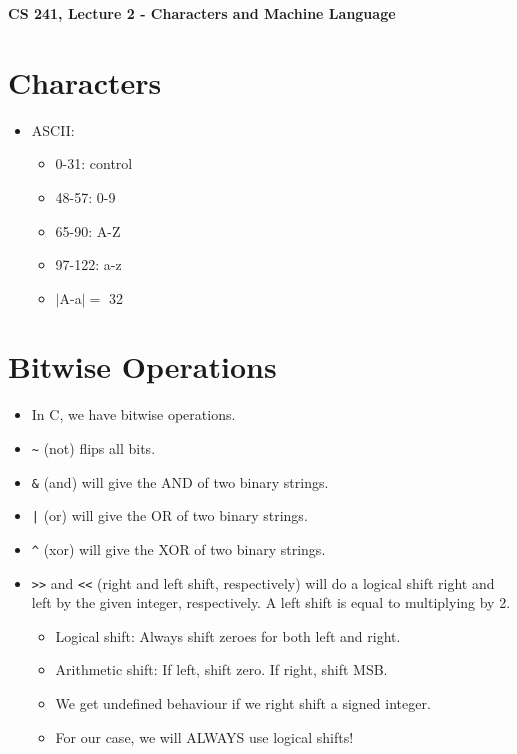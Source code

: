 \documentclass[12pt]{article}
\author{Clement Tsang}
\begin{document}
\begin{center}
\Large\textbf{CS 241, Lecture 2 - Characters and Machine Language}
\end{center}

\section{Characters}
\begin{itemize}
    \item ASCII:
        \begin{itemize}
            \item 0-31: control
            \item 48-57: 0-9
            \item 65-90: A-Z
            \item 97-122: a-z
            \item $|$A-a$| =$ 32
        \end{itemize} 
\end{itemize}

\section{Bitwise Operations}
\begin{itemize}
    \item In C, we have bitwise operations.
    \item \lstinline{~} (not) flips all bits.
    \item \lstinline{&} (and) will give the AND of two binary strings.
    \item \lstinline{|} (or) will give the OR of two binary strings.
    \item \lstinline{^} (xor) will give the XOR of two binary strings.
    \item \lstinline{>>} and \lstinline{<<} (right and left shift, respectively) will do a logical shift right and left by the given integer, respectively.  A left shift is equal to multiplying by 2.
        \begin{itemize}
            \item Logical shift: Always shift zeroes for both left and right.
            \item Arithmetic shift: If left, shift zero.  If right, shift MSB.
            \item We get undefined behaviour if we right shift a signed integer.  
            \item For our case, we will ALWAYS use logical shifts!
        \end{itemize} 
\end{itemize}
\end{document}

